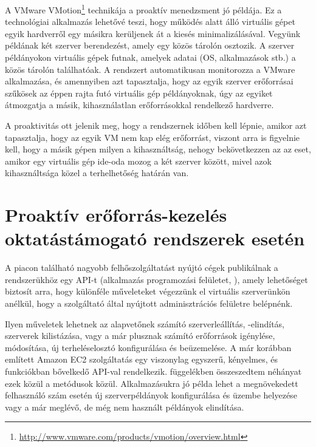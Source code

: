 A VMware VMotion\footnote{\href{http://www.vmware.com/products/vmotion/overview.html}{http://www.vmware.com/products/vmotion/overview.html}} technikája a proaktív menedzsment jó példája. Ez a technológiai alkalmazás lehetővé teszi, hogy működés alatt álló virtuális gépet egyik hardverről egy másikra kerüljenek át a kiesés minimalizálásával. Vegyünk példának két szerver berendezést, amely egy közös tárolón osztozik. A szerver példányokon virtuális gépek futnak, amelyek adatai (OS, alkalmazások stb.) a közös tárolón találhatóak. A rendszert automatikusan monitorozza a VMware alkalmazása, és amennyiben azt tapasztalja, hogy az egyik szerver erőforrásai szűkösek az éppen rajta futó virtuális gép példányoknak, úgy az egyiket átmozgatja a másik, kihasználatlan erőforrásokkal rendelkező hardverre.

A proaktivitás ott jelenik meg, hogy a rendszernek időben kell lépnie, amikor azt tapasztalja, hogy az egyik VM nem kap elég erőforrást, viszont arra is figyelnie kell, hogy a másik gépen milyen a kihasználtság, nehogy bekövetkezzen az az eset, amikor egy virtuális gép ide-oda mozog a két szerver között, mivel azok kihasználtsága közel a terhelhetőség határán van.

\section{Proaktív erőforrás-kezelés oktatástámogató rendszerek esetén}


A piacon található nagyobb felhőszolgáltatást nyújtó cégek publikálnak a rendszerükhöz egy API-t (alkalmazás programozási felületet, ), amely lehetőséget biztosít arra, hogy különféle műveleteket végezzünk el virtuális szerverünkön anélkül, hogy a szolgáltató által nyújtott adminisztrációs felületre belépnénk.

Ilyen műveletek lehetnek az alapvetőnek számító szerverleállítás, -elindítás, szerverek kilistázása, vagy a már plusznak számító erőforrások igénylése, módosítása, új terheléselosztó konfigurálása és beüzemelése. A már korábban említett Amazon EC2 szolgáltatás egy viszonylag egyszerű, kényelmes, és funkciókban bővelkedő API-val rendelkezik.  függelékben összeszedtem néhányat ezek közül a metódusok közül. Alkalmazásukra jó példa lehet a megnövekedett felhasználó szám esetén új szerverpéldányok konfigurálása és üzembe helyezése vagy a már meglévő, de még nem használt példányok elindítása.

